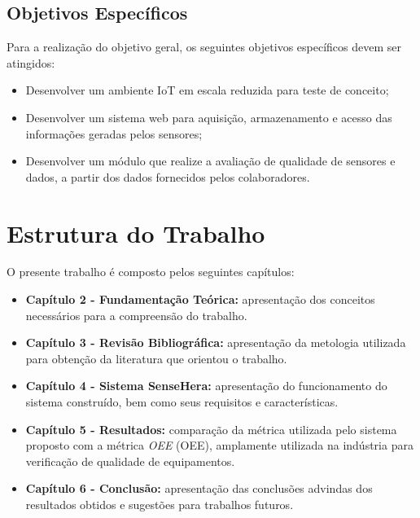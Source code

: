 \subsection{Objetivos Específicos}
Para a realização do objetivo geral, os seguintes objetivos específicos devem ser atingidos:
\begin{itemize}
  \item Desenvolver um ambiente \acrshort{IoT} em escala reduzida para teste de conceito;
  \item Desenvolver um sistema web para aquisição, armazenamento e acesso das informações geradas pelos sensores;
  \item Desenvolver um módulo que realize a avaliação de qualidade de sensores e dados, a partir dos dados fornecidos pelos colaboradores.
\end{itemize}
\section{Estrutura do Trabalho}
O presente trabalho é composto pelos seguintes capítulos:
\begin{itemize}
  \item \textbf{Capítulo 2 - Fundamentação Teórica:} apresentação dos conceitos necessários para a compreensão do
  trabalho.
  \item \textbf{Capítulo 3 - Revisão Bibliográfica:} apresentação da metologia utilizada para obtenção da literatura que orientou o trabalho.
  \item \textbf{Capítulo 4 - Sistema SenseHera:} apresentação do funcionamento do sistema construído, bem como seus requisitos e características.
  \item \textbf{Capítulo 5 - Resultados:} comparação da métrica utilizada pelo sistema proposto com a métrica \textit{\acrlong{OEE}} (\acrshort{OEE}), amplamente utilizada na indústria para verificação de qualidade de equipamentos.
  \item \textbf{Capítulo 6 - Conclusão:} apresentação das conclusões advindas dos resultados obtidos e
  sugestões para trabalhos futuros.
\end{itemize}
